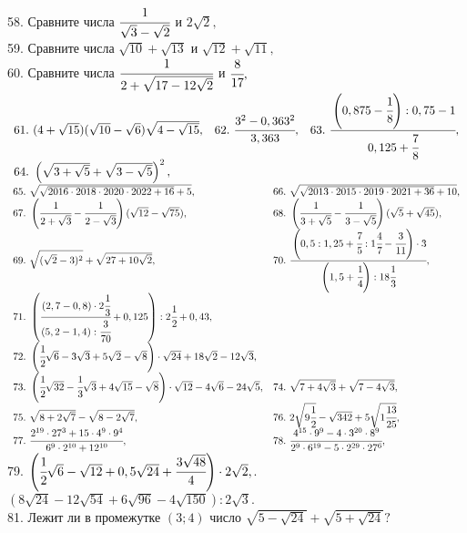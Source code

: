 \documentclass[12pt]{article}
\begin{document}
58. Сравните числа $\cfrac{1}{\sqrt{3}-\sqrt{2}}$ и $2\sqrt{2},$\\
59. Сравните числа $\sqrt{10}+\sqrt{13}$ и $\sqrt{12}+\sqrt{11},$\\
60. Сравните числа $\cfrac{1}{2+\sqrt{17-12\sqrt{2}}}$ и $\cfrac{8}{17},$\\
$\begin{array}{lll}
61.\ (4+\sqrt{15})(\sqrt{10}-\sqrt{6})\sqrt{4-\sqrt{15}},&
62.\ \cfrac{3^2-0,363^2}{3,363},&
63.\ \cfrac{\left(0,875-\cfrac{1}{8}\right):0,75-1}{0,125+\cfrac{7}{8}},\\
64.\ \left(\sqrt{3+\sqrt{5}}+\sqrt{3-\sqrt{5}}\right)^2,
\end{array}$\\
$\begin{array}{ll}
65.\ \sqrt{\sqrt{2016\cdot2018\cdot2020\cdot2022+16}+5},&
66.\ \sqrt{\sqrt{2013\cdot2015\cdot2019\cdot2021+36}+10},\\
67.\ \left(\cfrac{1}{2+\sqrt{3}}-\cfrac{1}{2-\sqrt{3}}\right)(\sqrt{12}-\sqrt{75}),&
68.\ \left(\cfrac{1}{3+\sqrt{5}}-\cfrac{1}{3-\sqrt{5}}\right)(\sqrt{5}+\sqrt{45}),\\
69.\ \sqrt{(\sqrt{2}-3)^2}+\sqrt{27+10\sqrt{2}},&
70.\ \cfrac{\left(0,5:1,25+\cfrac{7}{5}:1\cfrac{4}{7}-\cfrac{3}{11}\right)\cdot3}{\left(1,5+\cfrac{1}{4}\right):18\cfrac{1}{3}},\\
71.\ \left(\cfrac{(2,7-0,8)\cdot2\cfrac{1}{3}}{(5,2-1,4):\cfrac{3}{70}}+0,125\right):2\cfrac{1}{2}+0,43,\\
72.\ \left(\cfrac{1}{2}\sqrt{6}-3\sqrt{3}+5\sqrt{2}-\sqrt{8}\right)\cdot\sqrt{24}+18\sqrt{2}-12\sqrt{3},\\
73.\ \left(\cfrac{1}{2}\sqrt{32}-\cfrac{1}{3}\sqrt{3}+4\sqrt{15}-\sqrt{8}\right)\cdot\sqrt{12}-4\sqrt{6}-24\sqrt{5},&
74.\ \sqrt{7+4\sqrt{3}}+\sqrt{7-4\sqrt{3}},\\
75.\ \sqrt{8+2\sqrt{7}}-\sqrt{8-2\sqrt{7}},&
76.\ 2\sqrt{9\cfrac{1}{2}}-\sqrt{342}+5\sqrt{1\cfrac{13}{25}},\\
77.\ \cfrac{2^{19}\cdot27^3+15\cdot4^9\cdot9^4}{6^9\cdot2^{10}+12^{10}},&
78.\ \cfrac{4^{15}\cdot9^9-4\cdot3^{20}\cdot8^9}{2^9\cdot6^{19}-5\cdot2^{29}\cdot27^6},\end{array}$\\
79. $\left(\cfrac{1}{2}\sqrt{6}-\sqrt{12}+0,5\sqrt{24}+\cfrac{3\sqrt{48}}{4}\right)\cdot2\sqrt{2},$. $(8\sqrt{24}-12\sqrt{54}+6\sqrt{96}-4\sqrt{150}):2\sqrt{3}.$\\
81. Лежит ли в промежутке $(3;4)$ число $\sqrt{5-\sqrt{24}}+\sqrt{5+\sqrt{24}}?$\\
\end{document}
